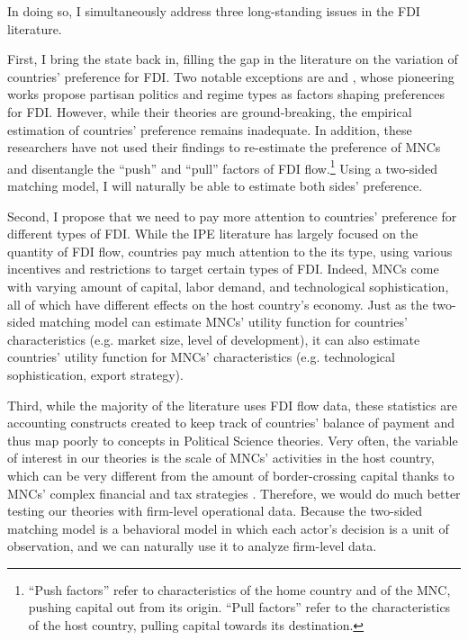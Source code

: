 In doing so, I simultaneously address three long-standing issues in the FDI
literature.

First, I bring the state back in, filling the gap in the literature on the
variation of countries' preference for FDI. Two notable exceptions are
\citet{Pinto2013} and \citet{Pandya2016}, whose pioneering works propose
partisan politics and regime types as factors shaping preferences for FDI.
However, while their theories are ground-breaking, the empirical estimation of
countries' preference remains inadequate. In addition, these researchers have
not used their findings to re-estimate the preference of MNCs and disentangle
the ``push'' and ``pull'' factors of FDI flow.\footnote{``Push factors'' refer
  to characteristics of the home country and of the MNC, pushing capital out
  from its origin. ``Pull factors'' refer to the characteristics of the host
  country, pulling capital towards its destination.} Using a two-sided matching
model, I will naturally be able to estimate both sides' preference.

Second, I propose that we need to pay more attention to countries' preference
for different types of FDI. While the IPE literature has largely focused on the
quantity of FDI flow, countries pay much attention to the its type, using
various incentives and restrictions to target certain types of FDI. Indeed, MNCs
come with varying amount of capital, labor demand, and technological
sophistication, all of which have different effects on the host country's
economy. Just as the two-sided matching model can estimate MNCs' utility
function for countries' characteristics (e.g. market size, level of
development), it can also estimate countries' utility function for MNCs'
characteristics (e.g. technological sophistication, export strategy).

Third, while the majority of the literature uses FDI flow data, these statistics
are accounting constructs created to keep track of countries' balance of payment
and thus map poorly to concepts in Political Science theories. Very often, the
variable of interest in our theories is the scale of MNCs' activities in the
host country, which can be very different from the amount of border-crossing
capital thanks to MNCs' complex financial and tax strategies \citep{Kerner2014}.
Therefore, we would do much better testing our theories with firm-level
operational data. Because the two-sided matching model is a behavioral model in
which each actor's decision is a unit of observation, and we can naturally use
it to analyze firm-level data.

